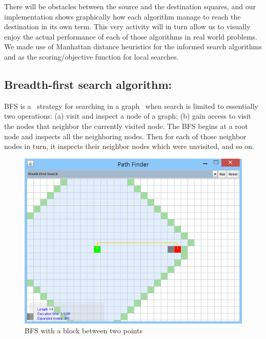 \documentclass[a4paper]{article}
\begin{document}
There will be obstacles between the source and the destination squares, and our implementation shows graphically how each algorithm manage to reach the destination in its own term. This very activity will in turn allow us to visually enjoy the actual performance of each of those algorithms in real world problems. We made use of Manhattan distance heuristics for the informed search algorithms and as the scoring/objective function for local searches.


\subsection{Breadth-first search algorithm:}

BFS is a  strategy for searching in a graph  when search is limited to essentially two operations: (a) visit and inspect a node of a graph; (b) gain access to visit the nodes that neighbor the currently visited node. The BFS begins at a root node and inspects all the neighboring nodes. Then for each of those neighbor nodes in turn, it inspects their neighbor nodes which were unvisited, and so on. \\

\begin{figure}[h!]
  \centering
    \includegraphics[scale=.9]{images/bfs1.png}
  \caption{BFS with a block between two points}
\end{figure}
\end{document}
